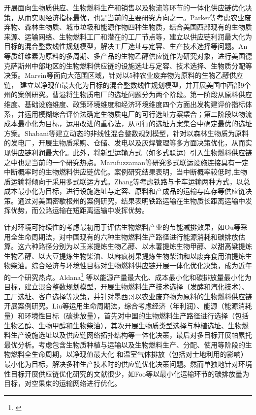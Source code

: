开展面向生物质供应、生物燃料生产和销售以及物流等环节的一体化供应链优化决策，从而实现经济指标最优，也是当前的主要研究方向之一。Parker等\cite{Parker2010}考虑农业废弃物、森林生物质、城市垃圾和能源作物四种生物质，结合美国西部现有的生物质来源、运输网络、生物燃料工厂和潜在的工厂节点等，建立以供应链利润最大化为目标的混合整数线性规划模型，解决工厂选址与定容、生产技术选择等问题。An等\cite{An2011a}质纤维素为原料的多周期、多产品的生物乙醇供应链作为研究对象，进行美国德克萨斯州中部地区的生物燃料供应链的设施选址与定容、技术选择、生物质分配等决策。Marvin等\cite{Marvin2012}面向大范围区域，针对以5种农业废弃物为原料的生物乙醇供应链， 建立以净现值最大化为目标的混合整数线性规划模型，并开展美国中西部9个州的案例研究。曹溢\cite{曹溢2013}将生物质电厂的选址问题分为两个阶段。第一阶段从原料供应维度、基础设施维度、政策环境维度和经济环境维度四个方面出发构建评价指标体系，并运用模糊综合评价法确定生物质电厂的可行选址方案栠合；第二阶段以物流成本最小化为目标，运用改进的重心法，从可行的选址方案集合中确定最优的选址方案。Shabani等\cite{Shabani2013}建立动态的非线性混合整数规划模型，针对以森林生物质为原料的发电厂，开展生物质采购、仓储、发电以及灰焊管理等多方面决策优化，从而实现供应链利润最大化。此外，将新型运输方式（如多式联运）引入生物燃料供应链之中也是当前的一个研究热点。Marufuzzaman等\cite{Marufuzzaman2014}研究多式联运设施连接具有一定中断概率时的生物燃料供应链优化。案例研究结果表明，当中断概率较低时,生物质运输将倾向于采用多式联运方式。Zhang等\cite{Zhang2016}考虑铁路与卡车运输两种方式，以总成本最小化为目标，进行设施选址与定容、原料和产成品的运输与库存等供应链决策。通过对美国密歇根州的案例研究，结果表明铁路运输在生物质长距离运输中发挥优势，而公路运输在短距离运输中发挥优势。

针对环境可持续性的考虑最初用于评估生物燃料产业的节能减排效果，如Ou等\cite{Ou2009}采用全生命周期法，对中国现有的六种生物燃料生产路径进行能源消耗和碳排放估算。这六种路径分别为以玉米提炼生物乙醇、以木薯提炼生物甲醇、以甜高粱提炼生物乙醇、以大豆提炼生物柴油、以麻疯树果提炼生物柴油和以废弃食用油提炼生物柴油。综合经济与环境性目标对生物燃料供应链开展一体化优化决策，成为近年的一个研究热点。Aldana\footnote{\label{ft:1}} 等以能源产量最大化、成本最小化和碳排放量最小化为目标，建立混合整数规划模型，开展生物燃料生产技术选择（发酵和汽化技术）、工厂选址、客户选择等决策，并针对墨西哥以农业废弃物为原料的生物燃料供应链开展案例研究。Liu等\cite{Liu2014}运用生命周期法，综合考虑经济（年利润）、能源（能源消耗量）和环境性目标（碳排放量），首先对中国的生物燃料生产路径进行选择（包括生物乙醇、生物甲醇和生物柴油），其次开展生物质类型选择与种植选址、生物燃料生产设施选址以及供应链网络拓扑结构等一体化决策，最后对多目标开展帕累托最优分析。\citet{d_Amore_2016}考虑包含生物质种植与运输以及生物燃料生产、分配、使用等阶段的生物燃料全生命周期，以净现值最大化 和温室气体排放（包括对士地利用的影响）最小化为目标，解决多种生产技术时的供应链优化决策问题。然而单独地针对环境性目标开展供应链优化研究的文献很少，如Foo等\cite{Foo2013}以最小化运输环节的碳排放量为目标，对空果束的运输网络进行优化。

